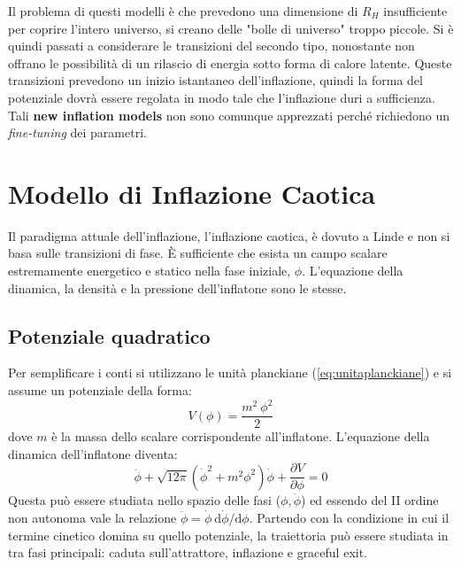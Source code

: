 Il problema di questi modelli è che prevedono una dimensione di $R_H$ insufficiente per coprire l'intero universo, si creano delle "bolle di universo" troppo piccole. Si è quindi passati a considerare le transizioni del secondo tipo, nonostante non offrano le possibilità di un rilascio di energia sotto forma di calore latente. Queste transizioni prevedono un inizio istantaneo dell'inflazione, quindi la forma del potenziale dovrà essere regolata in modo tale che l'inflazione duri a sufficienza. Tali \textbf{new inflation models} non sono comunque apprezzati perché richiedono un \textit{fine-tuning} dei parametri.

\section{Modello di Inflazione Caotica}
Il paradigma attuale dell'inflazione, l'inflazione caotica, è dovuto a Linde e non si basa sulle transizioni di fase. È sufficiente che esista un campo scalare estremamente energetico e statico nella fase iniziale, $\phi$. L'equazione della dinamica, la densità e la pressione dell'inflatone sono le stesse.
\subsection{Potenziale quadratico}
Per semplificare i conti si utilizzano le unità planckiane (\ref{eq:unitaplanckiane}) e si assume un potenziale della forma:
$$
V(\phi)= \frac{m^2~\phi^2}{2}
$$
dove $m$ è la massa dello scalare corrispondente all'inflatone. L'equazione della dinamica dell'inflatone diventa:
\begin{equation}
    \ddot{\phi} + \sqrt{12 \pi} \left( \dot{\phi}^2+m^2 \phi^2 \right) \dot{\phi} + \frac{\partial V}{\partial \phi} =0
\end{equation}
Questa può essere studiata nello spazio delle fasi ($\phi, \dot{\phi}$) ed essendo del II ordine non autonoma vale la relazione $\ddot{\phi} = \dot{\phi} ~ \mathrm{d} \dot{\phi} /\mathrm{d} \phi$. Partendo con la condizione in cui il termine cinetico domina su quello potenziale, la traiettoria può essere studiata in tra fasi principali: caduta sull'attrattore, inflazione e graceful exit.

